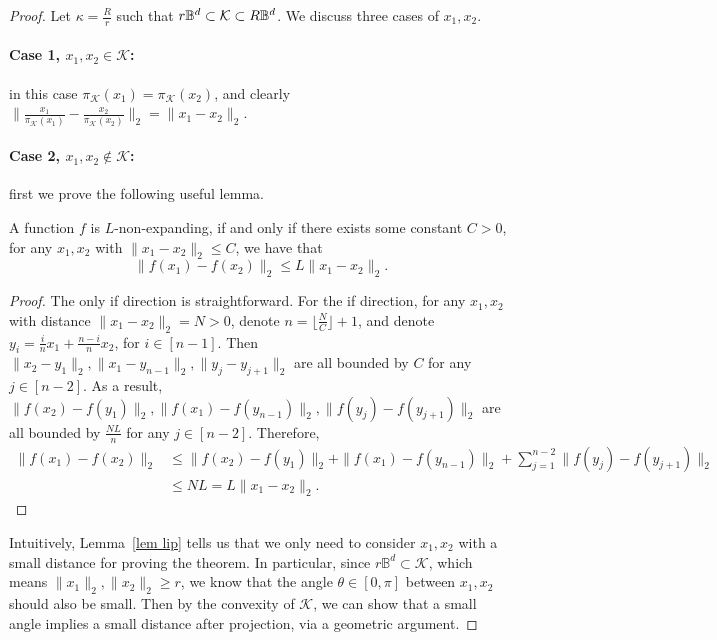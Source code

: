 \begin{proof} Let $\kappa=\frac{R}{r}$ such that $r\mathbb{B}^d\subset\mathcal{K}\subset R\mathbb{B}^{d}$. We discuss three cases of $x_1,x_2$.

\paragraph{Case 1, $x_1,x_2\in \mathcal{K}$:} in this case $\pi_{\mathcal{K}}(x_1)=\pi_{\mathcal{K}}(x_2)$, and clearly $\|\frac{x_1}{\pi_{\mathcal{K}}(x_1)}-\frac{x_2}{\pi_{\mathcal{K}}(x_2)}\|_2=\|x_1-x_2\|_2$.


\paragraph{Case 2, $x_1,x_2\notin \mathcal{K}$:} first we prove the following useful lemma.

\begin{lemma}
\label{lem lip}
    A function $f$ is $L$-non-expanding, if and only if there exists some constant $C>0$, for any $x_1,x_2$ with $\|x_1-x_2\|_2\le C$, we have that
    $$
    \|f(x_1)-f(x_2)\|_2\le L\|x_1-x_2\|_2.
    $$
\end{lemma} 
\begin{proof}
    The only if direction is straightforward. For the if direction, for any $x_1,x_2$ with distance $\|x_1-x_2\|_2=N>0$, denote $n=\lfloor \frac{N}{C}\rfloor+1$, and denote $y_i=\frac{i}{n}x_1+\frac{n-i}{n}x_2$, for $i\in [n-1]$. Then $\|x_2-y_1\|_2, \|x_1-y_{n-1}\|_2, \|y_j-y_{j+1}\|_2$ are all bounded by $C$ for any $j\in [n-2]$. As a result, $\|f(x_2)-f(y_1)\|_2, \|f(x_1)-f(y_{n-1})\|_2, \|f(y_j)-f(y_{j+1})\|_2$ are all bounded by $\frac{NL}{n}$ for any $j\in [n-2]$. Therefore,
    \begin{align*}
         \|f(x_1)-f(x_2)\|_2&\le \|f(x_2)-f(y_1)\|_2+ \|f(x_1)-f(y_{n-1})\|_2+\sum_{j=1}^{n-2} \|f(y_j)-f(y_{j+1})\|_2 \\
         &\le NL =L\|x_1-x_2\|_2.
    \end{align*}
\end{proof}

Intuitively, Lemma~\ref{lem lip} tells us that we only need to consider $x_1,x_2$ with a small distance for proving the theorem. In particular, since $r\mathbb{B}^d\subset \mathcal{K}$, which means $\|x_1\|_2,\|x_2\|_2\ge r$, we know that the angle $\theta\in [0,\pi]$ between $x_1,x_2$ should also be small. Then by the convexity of $\mathcal{K}$, we can show that a small angle implies a small distance after projection, via a geometric argument.


\end{proof}
